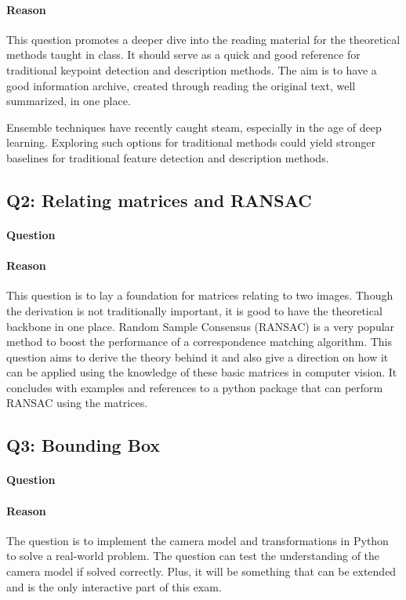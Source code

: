 \paragraph*{Reason}
This question promotes a deeper dive into the reading material for the theoretical methods taught in class. It should serve as a quick and good reference for traditional keypoint detection and description methods.
The aim is to have a good information archive, created through reading the original text, well summarized, in one place.

Ensemble techniques have recently caught steam, especially in the age of deep learning. Exploring such options for traditional methods could yield stronger baselines for traditional feature detection and description methods.


\subsection*{Q2: Relating matrices and RANSAC}

\paragraph*{Question}
\begin{displayquote}
    \questionTwo
\end{displayquote}

\paragraph*{Reason}
This question is to lay a foundation for matrices relating to two images. Though the derivation is not traditionally important, it is good to have the theoretical backbone in one place. Random Sample Consensus (RANSAC) is a very popular method to boost the performance of a correspondence matching algorithm. This question aims to derive the theory behind it and also give a direction on how it can be applied using the knowledge of these basic matrices in computer vision. It concludes with examples and references to a python package that can perform RANSAC using the matrices.

\subsection*{Q3: Bounding Box}

\paragraph*{Question}
\begin{displayquote}
    \questionThree
\end{displayquote}

\paragraph*{Reason}
The question is to implement the camera model and transformations in Python to solve a real-world problem. The question can test the understanding of the camera model if solved correctly. Plus, it will be something that can be extended and is the only interactive part of this exam.
